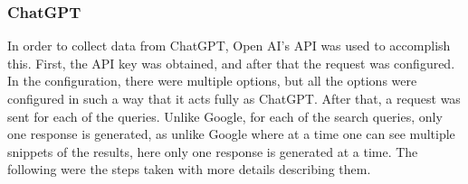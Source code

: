 \documentclass[50pt]{usiinfbachelorproject}
\begin{document}
\subsubsection{ChatGPT}
In order to collect data from ChatGPT, Open AI’s API was used to accomplish this. First, the API key was obtained, and after that the request was configured. In the configuration, there were multiple options, but all the options were configured in such a way that it acts fully as ChatGPT. After that, a request was sent for each of the queries. Unlike Google, for each of the search queries, only one response is generated, as unlike Google where at a time one can see multiple snippets of the results, here only one response is generated at a time. The following were the steps taken with more details describing them.
\end{document}
